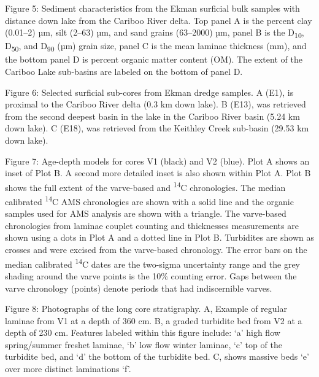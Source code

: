 \documentclass[
  letterpaper,
  DIV=11,
  numbers=noendperiod]{scrartcl}
\begin{document}
Figure 5: Sediment characteristics from the Ekman surficial bulk samples
with distance down lake from the Cariboo River delta. Top panel A is the
percent clay (0.01--2) µm, silt (2--63) µm, and sand grains (63--2000)
µm, panel B is the D\textsubscript{10}, D\textsubscript{50}, and
D\textsubscript{90} (µm) grain size, panel C is the mean laminae
thickness (mm), and the bottom panel D is percent organic matter content
(OM). The extent of the Cariboo Lake sub-basins are labeled on the
bottom of panel D.

Figure 6: Selected surficial sub-cores from Ekman dredge samples. A
(E1), is proximal to the Cariboo River delta (0.3 km down lake). B
(E13), was retrieved from the second deepest basin in the lake in the
Cariboo River basin (5.24 km down lake). C (E18), was retrieved from the
Keithley Creek sub-basin (29.53 km down lake).

Figure 7: Age-depth models for cores V1 (black) and V2 (blue). Plot A
shows an inset of Plot B. A second more detailed inset is also shown
within Plot A. Plot B shows the full extent of the varve-based and
\textsuperscript{14}C chronologies. The median calibrated
\textsuperscript{14}C AMS chronologies are shown with a solid line and
the organic samples used for AMS analysis are shown with a triangle. The
varve-based chronologies from laminae couplet counting and thicknesses
measurements are shown using a dots in Plot A and a dotted line in Plot
B. Turbidites are shown as crosses and were excised from the varve-based
chronology. The error bars on the median calibrated
\textsuperscript{14}C dates are the two-sigma uncertainty range and the
grey shading around the varve points is the 10\% counting error. Gaps
between the varve chronology (points) denote periods that had
indiscernible varves.

Figure 8: Photographs of the long core stratigraphy. A, Example of
regular laminae from V1 at a depth of 360 cm. B, a graded turbidite bed
from V2 at a depth of 230 cm. Features labeled within this figure
include: `a' high flow spring/summer freshet laminae, `b' low flow
winter laminae, `c' top of the turbidite bed, and `d' the bottom of the
turbidite bed. C, shows massive beds `e' over more distinct laminations
`f'.
\end{document}

